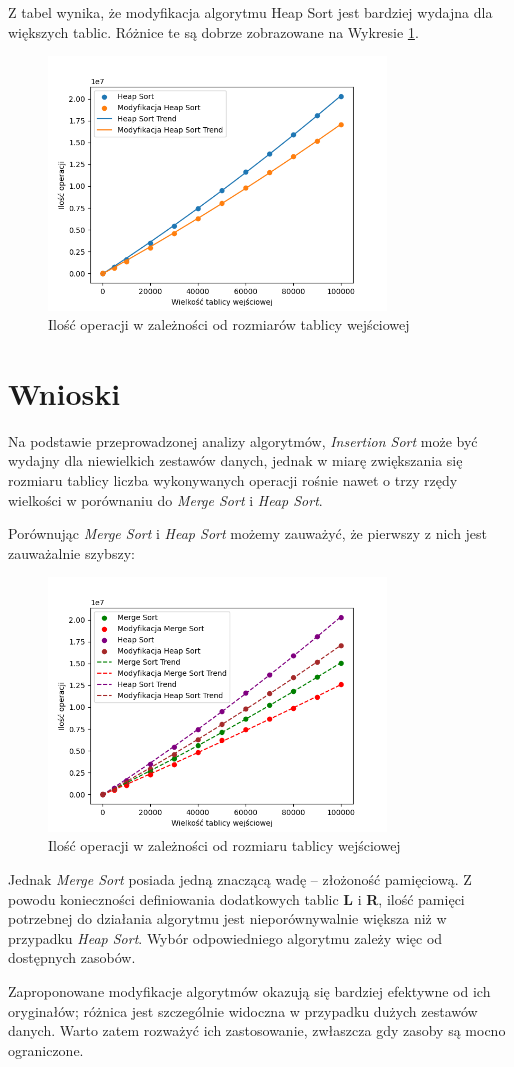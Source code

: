 \documentclass{article}
\begin{document}
Z tabel wynika, że modyfikacja algorytmu Heap Sort jest bardziej wydajna dla większych tablic. Różnice te są dobrze zobrazowane na Wykresie \ref{fig:heap}.

\begin{figure}[H]
    \centering
    \includegraphics[width=0.8\textwidth]{Figure_3.png}
    \caption{Ilość operacji w zależności od rozmiarów tablicy wejściowej}
    \label{fig:heap}
\end{figure}
\section{Wnioski}
Na podstawie przeprowadzonej analizy algorytmów, \textit{Insertion Sort} może być wydajny dla niewielkich zestawów danych, jednak w miarę zwiększania się rozmiaru tablicy liczba wykonywanych operacji rośnie nawet o trzy rzędy wielkości w porównaniu do \textit{Merge Sort} i \textit{Heap Sort}.

Porównując \textit{Merge Sort} i \textit{Heap Sort} możemy zauważyć, że pierwszy z nich jest zauważalnie szybszy:
\begin{figure}[H]
    \centering
    \includegraphics[width=0.8\textwidth]{Figure_4.png}
    \caption{Ilość operacji w zależności od rozmiaru tablicy wejściowej}
    \label{fig:heapmerge}
\end{figure}
Jednak \textit{Merge Sort} posiada jedną znaczącą wadę – złożoność pamięciową. Z powodu konieczności definiowania dodatkowych tablic \textbf{L} i \textbf{R}, ilość pamięci potrzebnej do działania algorytmu jest nieporównywalnie większa niż w przypadku \textit{Heap Sort}. Wybór odpowiedniego algorytmu zależy więc od dostępnych zasobów.

Zaproponowane modyfikacje algorytmów okazują się bardziej efektywne od ich oryginałów; różnica jest szczególnie widoczna w przypadku dużych zestawów danych. Warto zatem rozważyć ich zastosowanie, zwłaszcza gdy zasoby są mocno ograniczone.
\end{document}
